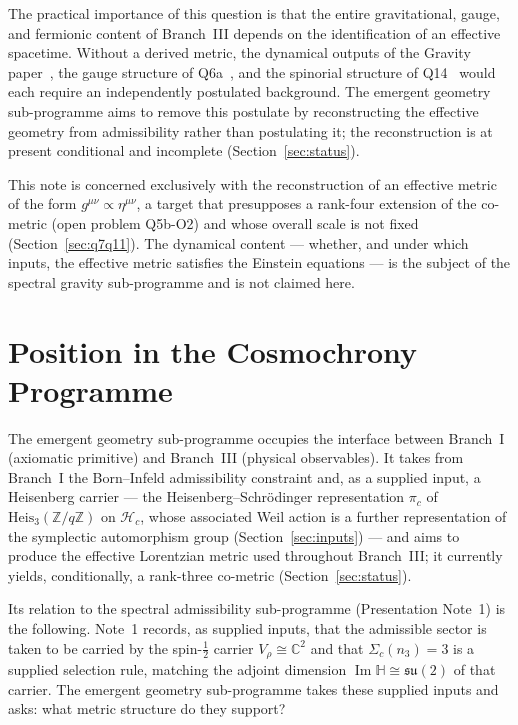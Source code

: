 \documentclass[11pt,a4paper]{article}
\theoremstyle{definition}
\newcommand{\Heis}{\mathrm{Heis}}
\newcommand{\su}{\mathfrak{su}}
\newcommand{\geff}{g^{\mu\nu}}
\renewcommand{\Im}{\operatorname{Im}}
\begin{document}
    \medskip
    The practical importance of this question is that the entire gravitational, gauge, and
    fermionic content of Branch~III depends on the identification of an effective spacetime.
    Without a derived metric, the dynamical outputs of the Gravity paper~\cite{Beau2026h},
    the gauge structure of Q6a~\cite{Beau2026q6a}, and the spinorial structure of
    Q14~\cite{Beau2026q14} would each require an independently postulated background.
    The emergent geometry sub-programme aims to remove this postulate by reconstructing the
    effective geometry from admissibility rather than postulating it; the reconstruction is at
    present conditional and incomplete (Section~\ref{sec:status}).

    \medskip
    This note is concerned exclusively with the reconstruction of an effective metric of the
    form $\geff \propto \eta^{\mu\nu}$, a target that presupposes a rank-four extension of the
    co-metric (open problem Q5b-O2) and whose overall scale is not fixed
    (Section~\ref{sec:q7q11}).
    The dynamical content — whether, and under which inputs, the effective metric satisfies the Einstein
    equations — is the subject of the spectral gravity sub-programme and is not claimed here.

  \section{Position in the Cosmochrony Programme}
    \label{sec:position}

    The emergent geometry sub-programme occupies the interface between Branch~I (axiomatic
    primitive) and Branch~III (physical observables).
    It takes from Branch~I the Born--Infeld admissibility constraint and, as a supplied
    input, a Heisenberg carrier --- the Heisenberg--Schr\"{o}dinger representation $\pi_c$ of
    $\Heis_3(\mathbb{Z}/q\mathbb{Z})$ on $\mathcal{H}_c$, whose associated Weil action is a further
    representation of the symplectic automorphism group (Section~\ref{sec:inputs}) --- and
    aims to produce the effective Lorentzian metric used throughout Branch~III; it currently
    yields, conditionally, a rank-three co-metric (Section~\ref{sec:status}).

    \medskip
    Its relation to the spectral admissibility sub-programme (Presentation Note~1) is the
    following.
    Note~1 records, as supplied inputs, that the admissible sector is taken to be carried
    by the spin-$\tfrac{1}{2}$ carrier $V_\rho \cong \mathbb{C}^2$ and that
    $\Sigma_c(n_3) = 3$ is a supplied selection rule, matching the adjoint dimension
    $\Im\mathbb{H} \cong \su(2)$ of that carrier.
    The emergent geometry sub-programme takes these supplied inputs and asks: what metric
    structure do they support?
\end{document}
